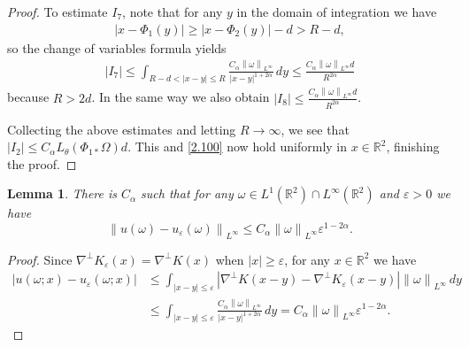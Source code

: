 \documentclass[reqno,centertags,12pt]{amsart}
\newtheorem{lemma}[theorem]{Lemma}
\theoremstyle{definition}
\numberwithin{equation}{section}
\newcommand{\abs}[1]{\left\lvert#1\right\rvert}
\newcommand{\norm}[1]{\left\|#1\right\|}
\newcommand{\bbR}{{\mathbb{R}}}
\newcommand{\eps}{\varepsilon}
\newcommand{\tht}{\theta}
\begin{document}
\begin{proof}
    To estimate $I_{7}$, note that for any $y$ in the domain of integration we have
    \begin{align*}
        \abs{x - \Phi_{1}(y)} \geq \abs{x - \Phi_{2}(y)} - d > R - d,
    \end{align*}
    so the change of variables formula yields
    \begin{align*}
        \abs{I_{7}} \leq \int_{R - d < \abs{x - y} \leq R}
        \frac{C_{\alpha}\norm{\omega}_{L^{\infty}}}
        {\abs{x - y}^{1 + 2\alpha}}\,dy
        \leq \frac{ C_{\alpha}\norm{\omega}_{L^{\infty}}d}{R^{2\alpha}}
    \end{align*}
    because ${R} >2d$.
    In the same way we also obtain $|I_{8}|\le \frac{C_{\alpha}\norm{\omega}_{L^{\infty}}d}{R^{2\alpha}}$.
    
    Collecting the above estimates and letting $R\to\infty$, we see that
    $\abs{I_{2}} \leq C_{\alpha}L_{\tht}(\Phi_{1*}\Omega)d$.  This and \eqref{2.100} now hold uniformly in $x\in\bbR^{2}$, finishing the proof.
\end{proof}

\begin{lemma}\label{L2.3}
    There is $C_{\alpha}$ such that for any
    $\omega\in L^{1}(\bbR^{2})\cap L^{\infty}(\bbR^{2})$ and $\eps>0$ we have
    \[
        \norm{u(\omega) - u_{\eps}(\omega)}_{L^{\infty}}
        \leq C_{\alpha}\norm{\omega}_{L^{\infty}}\eps^{1-2\alpha}.
    \]
\end{lemma}

\begin{proof}
    Since $\nabla^{\perp}K_{\eps}(x) = \nabla^{\perp}K(x)$
    when $\abs{x}\geq\eps$, for any $x\in\bbR^{2}$ we have
    \begin{align*}
        \abs{u(\omega;x) - u_{\eps}(\omega;x)}
        &\leq \int_{\abs{x - y}\leq \eps}
        \abs{\nabla^{\perp}K(x-y) - \nabla^{\perp}K_{\eps}(x-y)}
        \norm{\omega}_{L^{\infty}}\,dy \\
        &\leq \int_{\abs{x - y}\leq \eps}
        \frac{C_{\alpha}\norm{\omega}_{L^{\infty}}}{\abs{x - y}^{1 + 2\alpha}}\,dy
        = C_{\alpha}\norm{\omega}_{L^{\infty}}\eps^{1-2\alpha}.
    \end{align*}
\end{proof}
\end{document}
